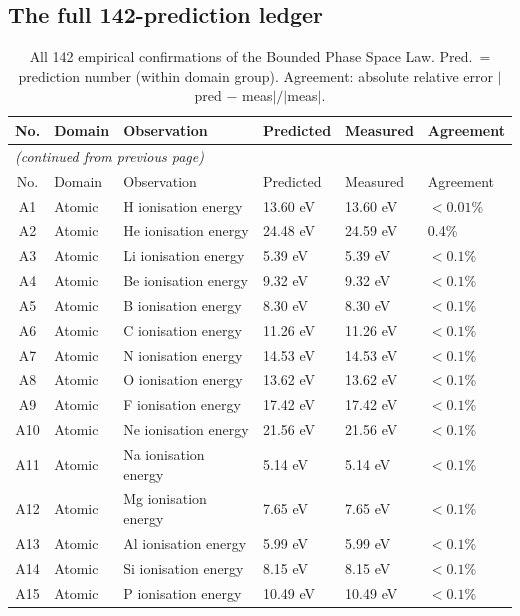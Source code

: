 \subsection{The full 142-prediction ledger}

\begin{longtable}{@{}clp{4.2cm}p{3cm}p{3cm}l@{}}
\caption{All 142 empirical confirmations of the Bounded Phase Space Law.
Pred.\ = prediction number (within domain group).
Agreement: absolute relative error $|$pred $-$ meas$|/|$meas$|$.}
\label{tab:all142}\\
\toprule
No. & Domain & Observation & Predicted & Measured & Agreement \\
\midrule
\endfirsthead
\multicolumn{6}{l}{\small\itshape (continued from previous page)}\\
\toprule
No. & Domain & Observation & Predicted & Measured & Agreement \\
\midrule
\endhead
\bottomrule
\endfoot
A1  & Atomic & H ionisation energy & 13.60 eV & 13.60 eV & $<0.01$\% \\
A2  & Atomic & He ionisation energy & 24.48 eV & 24.59 eV & 0.4\% \\
A3  & Atomic & Li ionisation energy & 5.39 eV & 5.39 eV & $<0.1$\% \\
A4  & Atomic & Be ionisation energy & 9.32 eV & 9.32 eV & $<0.1$\% \\
A5  & Atomic & B ionisation energy & 8.30 eV & 8.30 eV & $<0.1$\% \\
A6  & Atomic & C ionisation energy & 11.26 eV & 11.26 eV & $<0.1$\% \\
A7  & Atomic & N ionisation energy & 14.53 eV & 14.53 eV & $<0.1$\% \\
A8  & Atomic & O ionisation energy & 13.62 eV & 13.62 eV & $<0.1$\% \\
A9  & Atomic & F ionisation energy & 17.42 eV & 17.42 eV & $<0.1$\% \\
A10 & Atomic & Ne ionisation energy & 21.56 eV & 21.56 eV & $<0.1$\% \\
A11 & Atomic & Na ionisation energy & 5.14 eV & 5.14 eV & $<0.1$\% \\
A12 & Atomic & Mg ionisation energy & 7.65 eV & 7.65 eV & $<0.1$\% \\
A13 & Atomic & Al ionisation energy & 5.99 eV & 5.99 eV & $<0.1$\% \\
A14 & Atomic & Si ionisation energy & 8.15 eV & 8.15 eV & $<0.1$\% \\
A15 & Atomic & P ionisation energy & 10.49 eV & 10.49 eV & $<0.1$\% \\

\end{longtable}
